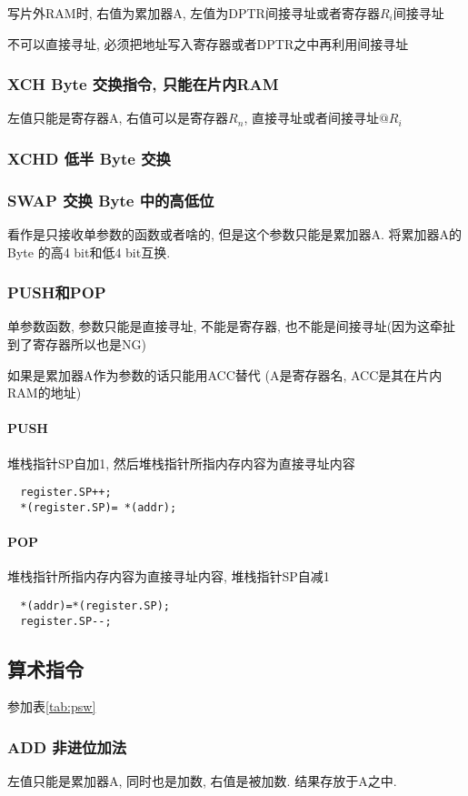 \documentclass[a4paper]{report}
\begin{document}
写片外RAM时, 右值为累加器A, 左值为DPTR间接寻址或者寄存器$R_i$间接寻址

不可以直接寻址, 必须把地址写入寄存器或者DPTR之中再利用间接寻址
\subsubsection{XCH Byte 交换指令, 只能在片内RAM}
左值只能是寄存器A, 右值可以是寄存器$R_n$, 直接寻址或者间接寻址$@R_i$
\subsubsection{XCHD 低半 Byte 交换}
\subsubsection{SWAP 交换 Byte 中的高低位}
看作是只接收单参数的函数或者啥的, 但是这个参数只能是累加器A. 将累加器A的Byte 的高4 bit和低4 bit互换. 
\subsubsection{PUSH和POP}
单参数函数, 参数只能是直接寻址, 不能是寄存器, 也不能是间接寻址(因为这牵扯到了寄存器所以也是NG)

如果是累加器A作为参数的话只能用ACC替代 (A是寄存器名, ACC是其在片内RAM的地址)

\paragraph{PUSH} 堆栈指针SP自加1, 然后堆栈指针所指内存内容为直接寻址内容
\begin{verbatim}
  register.SP++;
  *(register.SP)= *(addr);
\end{verbatim}
\paragraph{POP} 堆栈指针所指内存内容为直接寻址内容, 堆栈指针SP自减1
\begin{verbatim}
  *(addr)=*(register.SP);
  register.SP--;
\end{verbatim}
\subsection{算术指令}
参加表\ref{tab:psw}

\subsubsection{ADD 非进位加法}
左值只能是累加器A, 同时也是加数, 右值是被加数. 结果存放于A之中. 
\end{document}
